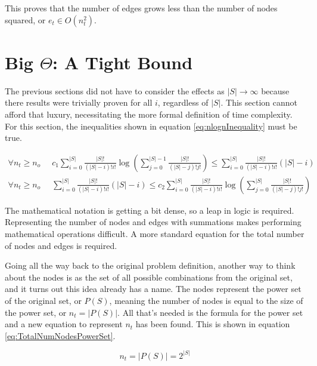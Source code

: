 \documentclass{article}
\begin{document}
This proves that the number of edges grows less than the number of nodes squared, or $e_t\in O(n_t^2)$.

\section{Big $\Theta$: A Tight Bound}
\label{sec:TightBound}

The previous sections did not have to consider the effects as $|S|\to \infty$ because there results were trivially proven for all $i$, regardless of $|S|$. This section cannot afford that luxury, necessitating the more formal definition of time complexity. For this section, the inequalities shown in equation \ref{eq:nlognInequality} must be true.

\begin{equation}
    \begin{split}
        \forall n_t\ge n_o \;\; &
        c_1\sum_{i=0}^{|S|}\frac{|S|!}{(|S|-i)!i!}
        \log \left( \sum_{j=0}^{|S|-1}\frac{|S|!}{(|S|-j)!j!} \right)
        \le
        \sum_{i=0}^{|S|}\frac{|S|!}{(|S|-i)!i!}(|S|-i)
        \\
        \forall n_t\ge n_o \;\; &
        \sum_{i=0}^{|S|}\frac{|S|!}{(|S|-i)!i!}(|S|-i)
        \le
        c_2\sum_{i=0}^{|S|}\frac{|S|!}{(|S|-i)!i!}
        \log \left( \sum_{j=0}^{|S|}\frac{|S|!}{(|S|-j)!j!} \right)
    \end{split}
    \label{eq:nlognInequality}
\end{equation}

The mathematical notation is getting a bit dense, so a leap in logic is required. Representing the number of nodes and edges with summations makes performing mathematical operations difficult. A more standard equation for the total number of nodes and edges is required.

Going all the way back to the original problem definition, another way to think about the nodes is as the set of all possible combinations from the original set, and it turns out this idea already has a name. The nodes represent the power set of the original set, or $P(S)$, meaning the number of nodes is equal to the size of the power set, or $n_t=|P(S)|$. All that's needed is the formula for the power set and a new equation to represent $n_t$ has been found. This is shown in equation \ref{eq:TotalNumNodesPowerSet}.

\begin{equation}
    n_t=|P(S)|=2^{|S|}
    \label{eq:TotalNumNodesPowerSet}
\end{equation}
\end{document}
